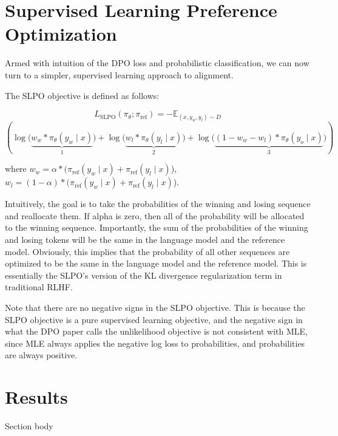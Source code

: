 \documentclass[twoside,11pt]{article}
\begin{document}
\section{Supervised Learning Preference Optimization}

Armed with intuition of the DPO loss and probabilistic classification, we can
now turn to a simpler, supervised learning approach to alignment.

The SLPO objective is defined as follows:

\[
  L_\mathrm{SLPO}(\pi_\theta; \pi_\mathrm{ref}) =
  -\mathbb{E}_{(x, y_w, y_l) \sim D} 
\]
\[
  \left(
  \log\big(
    \underbrace{
      w_w * \pi_\theta(y_w \mid x)
    }_{1}
  )
    + 
  \log\big(
    \underbrace{
      w_l * \pi_\theta(y_l \mid x)
    }_{2}
  )
  + 
  \log\big(
    \underbrace{
      (1 - w_w - w_l) * \pi_\theta(y_o \mid x)
    }_{3}
  ) 
  \right)
\]

where $w_w = \alpha * (\pi_\mathrm{ref}(y_w \mid x) + \pi_\mathrm{ref}(y_l \mid x)$),
$w_l = (1 - \alpha) * (\pi_\mathrm{ref}(y_w \mid x) + \pi_\mathrm{ref}(y_l \mid x)$). 


Intuitively, the goal is to take the probabilities of the winning
and losing sequence and reallocate them. If alpha is zero, then all of the
probability will be allocated to the winning sequence. Importantly,
the
sum of the probabilities of the winning and losing tokens will be the same in
the language model and the reference model. Obviously, this implies that 
the probability of all other sequences are optimized to be the same
in the language model and the reference model. 
This is essentially the SLPO's version of
the KL divergence regularization term in traditional RLHF. 

Note that there are no negative signs in the SLPO objective. This is because
the SLPO objective is a pure supervised learning objective, and the negative
sign in what the DPO paper calls the unlikelihood objective is not 
consistent with MLE, since MLE always applies the negative log loss to
probabilities, and probabilities are always positive. 

\section{Results}





Section body
\end{document}
